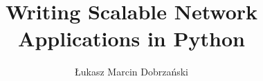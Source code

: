 \documentclass[msc,oneside,11pt,norunningheaders]{ubcthesiscpbl}
\title{Writing Scalable Network Applications in Python}
\subtitle{}
\author{Łukasz Marcin Dobrzański}
\newcommand{\ifdoDoubleSpace}[1]{}
\def\setpageforTOC{\setcounter{page}{2}}
\def\setpageforTOC{}
\def\dedication#1{
  \chapter[Dedication]{} %
  \thispagestyle{plain}   %
  \vspace{6cm}
  \begin{center}
    #1
  \end{center}
  }
\begin{document}

\ifdoDoubleSpace{ \begin{singlespace} }

\frontmatter

\maketitle
\newpage\thispagestyle{empty}\newpage  %


\newpage\thispagestyle{empty}\newpage  %
\setpageforTOC

\tableofcontents
\listoftables
\listoffigures



		
\newpage				%
\thispagestyle{plain}		%
\mainmatter			%

\ifdoDoubleSpace{ \end{singlespace} }

     
\begin{spacing}{1.0}
	
	
\end{spacing}

	
\end{document}
